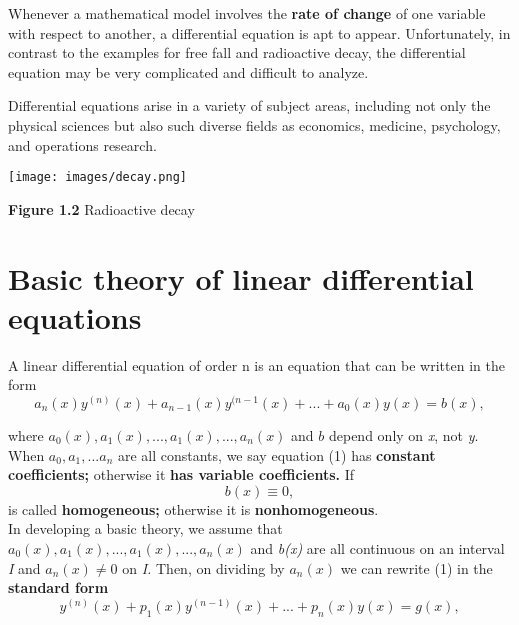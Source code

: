 \documentclass{article}
\begin{document}
Whenever a mathematical model involves the \textbf{rate of change} of one variable with respect to another, a differential equation is apt to appear. Unfortunately, in contrast to the examples for free fall and radioactive decay, the differential equation may be very complicated and difficult to analyze.

Differential equations arise in a variety of subject areas, including not only the physical sciences but also such diverse fields as economics, medicine, psychology, and operations research.

\begin{center}
    
\texttt{[image: images/decay.png]}
\end{center}
\begin{center}
\textbf{Figure 1.2} Radioactive decay
\end{center}


\section{Basic theory of linear differential equations}

A linear differential equation of order n is an equation that can be written in the form
\begin{equation}
    a_n(x)y^{(n)}(x)+a_{n-1}(x)y^{(n-1}(x) + ... + a_0(x)y(x) = b(x) ,
\end{equation}

where \begin{math} a_0(x),a_1(x),...,a_1(x),...,a_n(x) \end{math} and \begin{math} b \end{math} depend only on \textsl{x}, not \textsl{y}. When \begin{math} a_0,a_1,...a_n \end{math} are all constants, we say equation (1) has \textbf{constant coefficients;} otherwise it \textbf{has variable coefficients.} If\begin{equation*}
    b(x) \equiv 0,
\end{equation*}
is called \textbf{homogeneous;} otherwise it is \textbf{nonhomogeneous}.\\
\indent\setlength{\parindent}{1em} In developing a basic theory, we assume that \begin{math} a_0(x),a_1(x),...,a_1(x),...,a_n(x) \end{math} and \textsl{b(x)} are all continuous on an interval \textsl{I} and \begin{math} a_n(x) \neq 0 \end{math} on \textsl{I.} Then, on dividing by \begin{math} a_n(x) \end{math} we can rewrite (1) in the \textbf{standard form}
\begin{equation}
    y^{(n)}(x) + p_1(x)y^{(n-1)}(x) + ... + p_n(x)y(x) = g(x) ,
\end{equation}
\end{document}
